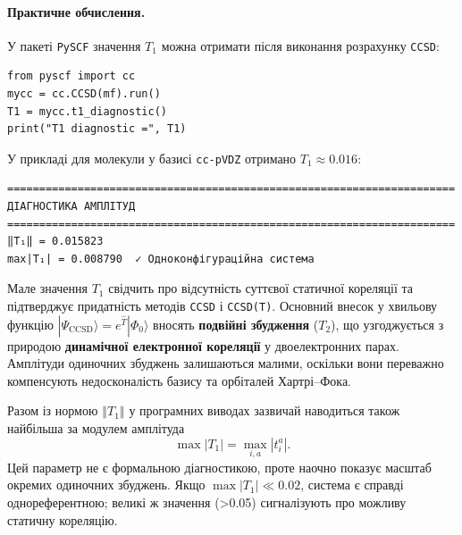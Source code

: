 \paragraph{Практичне обчислення.}
У пакеті \texttt{PySCF} значення $T_1$ можна отримати
після виконання розрахунку \texttt{CCSD}:
\begin{verbatim}
from pyscf import cc
mycc = cc.CCSD(mf).run()
T1 = mycc.t1_diagnostic()
print("T1 diagnostic =", T1)
\end{verbatim}

У прикладі  для молекули  у базисі \texttt{cc-pVDZ}
отримано \(T_1 \approx 0.016\):
\begin{verbatim}
======================================================================
ДІАГНОСТИКА АМПЛІТУД
======================================================================
‖T₁‖ = 0.015823
max|T₁| = 0.008790  ✓ Одноконфігураційна система
\end{verbatim}

Мале значення $T_1$ свідчить про відсутність суттєвої
статичної кореляції та підтверджує придатність методів
\texttt{CCSD} і \texttt{CCSD(T)}.
Основний внесок у хвильову функцію
\(|\Psi_{\text{CCSD}}\rangle = e^{\hat{T}}|\Phi_0\rangle\)
вносять \textbf{подвійні збудження} (\(T_2\)),
що узгоджується з природою \textbf{динамічної електронної кореляції}
у двоелектронних парах. Амплітуди одиночних збуджень залишаються малими,
оскільки вони переважно компенсують недосконалість базису
та орбіталей Хартрі–Фока.

\begin{commentbox}
Разом із нормою \(‖T_1‖\) у програмних виводах зазвичай наводиться
також найбільша за модулем амплітуда
\[
\max|T_1| = \max_{i,a} |t_i^a|.
\]
Цей параметр не є формальною діагностикою, проте наочно показує
масштаб окремих одиночних збуджень. Якщо \(\max|T_1| \ll 0.02\),
система є справді однореферентною; великі ж значення
(>0.05) сигналізують про можливу статичну кореляцію.
\end{commentbox}






